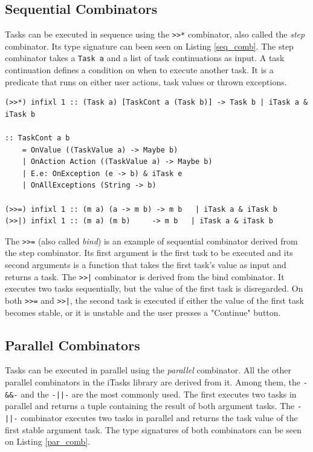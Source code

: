 \subsection{Sequential Combinators}

Tasks can be executed in sequence using the \texttt{>>*} combinator, also called the \textit{step} combinator. Its type signature can been seen on Listing \ref{seq_comb}. The step combinator takes a \texttt{Task a} and a list of task continuations as input. A task continuation defines a condition on when to execute another task. It is a predicate that runs on either user actions, task values or thrown exceptions.

\begin{lstlisting}[caption=Sequential combinators,label=seq_comb,captionpos=b]
(>>*) infixl 1 :: (Task a) [TaskCont a (Task b)] -> Task b | iTask a & iTask b

:: TaskCont a b                               
	= OnValue ((TaskValue a) -> Maybe b)         
	| OnAction Action ((TaskValue a) -> Maybe b) 
	| E.e: OnException (e -> b) & iTask e        
	| OnAllExceptions (String -> b)

(>>=) infixl 1 :: (m a) (a -> m b) -> m b   | iTask a & iTask b
(>>|) infixl 1 :: (m a) (m b)     -> m b   | iTask a & iTask b
\end{lstlisting}

The \texttt{>>=} (also called \textit{bind}) is an example of sequential combinator derived from the step combinator. Its first argument is the first task to be executed and its second arguments is a function that takes the first task's value as input and returns a task. The \texttt{>>|} combinator is derived from the bind combinator. It executes two tasks sequentially, but the value of the first task is disregarded. On both \texttt{>>=} and \texttt{>>|}, the second task is executed if either the value of the first task becomes stable, or it is unstable and the user presses a "Continue" button.

\subsection{Parallel Combinators}

Tasks can be executed in parallel using the \textit{parallel} combinator. All the other parallel combinators in the iTasks library are derived from it. Among them, the \texttt{-\&\&-} and the \texttt{-||-} are the most commonly used. The first executes two tasks in parallel and returns a tuple containing the result of both argument tasks. The \texttt{-||-} combinator executes two tasks in parallel and returns the task value of the first stable argument task. The type signatures of both combinators can be seen on Listing \ref{par_comb}.


